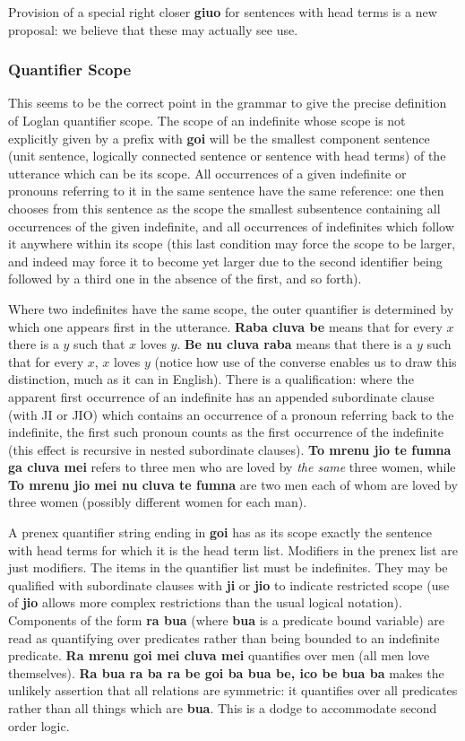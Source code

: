 \documentclass[12pt]{book}
\begin{document}
{Provision of a special right closer {\bf giuo} for sentences with head terms is a new proposal:  we believe that these may actually see use.

\subsubsection{Quantifier Scope}

This seems to be the correct point in the grammar to give the precise definition of Loglan quantifier scope.  The scope of an indefinite whose scope is not explicitly given by a prefix with {\bf goi} will be the smallest component sentence (unit sentence, logically connected sentence or sentence with head terms) of the utterance which can be its scope.  All occurrences of a given indefinite or pronouns referring to it in the same sentence have the same reference:  one then chooses from this sentence as the scope the smallest subsentence containing all occurrences of the given indefinite, and all occurrences of indefinites which follow it anywhere within its scope (this last condition may force the scope to be larger, and indeed may force it to become yet larger due to the second identifier being followed by a third one in the absence of the first, and so forth). 

Where two indefinites have the same scope, the outer quantifier is determined by which one appears first in the utterance.  {\bf Raba cluva be} means that for every $x$ there is a $y$ such that $x$ loves $y$.  {\bf Be nu cluva raba} means that there is a $y$ such that for every $x$, $x$ loves $y$ (notice how use of the converse enables us to draw this distinction, much as it can in English).  There is a qualification:  where the apparent first occurrence of an indefinite has an appended subordinate clause (with JI or JIO) which contains an occurrence of a pronoun referring back to the indefinite, the first such pronoun counts as the first occurrence of the indefinite (this effect is recursive in nested subordinate clauses).  {\bf To mrenu jio te fumna ga cluva mei} refers to three men who are loved by {\em the same\/} three women, while {\bf To mrenu jio mei nu cluva te fumna} are two men each of whom are loved by three women (possibly different women for each man).

A prenex quantifier string ending in {\bf goi} has as its scope exactly the sentence with head terms for which it is the head term list.  Modifiers
in the prenex list are just modifiers.  The items in the quantifier list must be indefinites.  They may be qualified with subordinate clauses with
{\bf ji} or {\bf jio} to indicate restricted scope (use of {\bf jio} allows more complex restrictions than the usual logical notation).  Components of the 
form {\bf ra bua} (where {\bf bua} is a predicate bound variable) are read as quantifying over predicates rather than being bounded to an indefinite predicate.  {\bf Ra mrenu goi mei cluva mei}  quantifies over men (all men love themselves).  {\bf Ra bua ra ba ra be goi ba bua be, ico be bua ba} makes the unlikely assertion that all relations are symmetric:  it quantifies over all predicates rather than all things which are {\bf bua}.  This is a dodge to accommodate second order logic.

}
\end{document}
